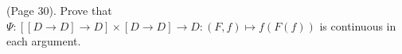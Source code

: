 (Page 30). Prove that $ \Psi : [[D \to D] \to D] \times [D \to D] \to D : (F,f) \mapsto f(F(f)) $
is continuous in each argument.